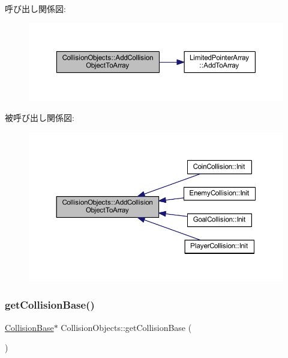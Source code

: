 呼び出し関係図\+:\nopagebreak
\begin{figure}[H]
\begin{center}
\leavevmode
\includegraphics[width=350pt]{class_collision_objects_a50d6593f98cd04e23ad7ea9102eccc3c_cgraph}
\end{center}
\end{figure}
被呼び出し関係図\+:\nopagebreak
\begin{figure}[H]
\begin{center}
\leavevmode
\includegraphics[width=350pt]{class_collision_objects_a50d6593f98cd04e23ad7ea9102eccc3c_icgraph}
\end{center}
\end{figure}
\mbox{\label{class_collision_objects_af95769194fff92babcf411c2262c9d10}} 
\subsubsection{\texorpdfstring{get\+Collision\+Base()}{getCollisionBase()}}
{\footnotesize\ttfamily \mbox{\hyperlink{class_collision_base}{Collision\+Base}}$\ast$ Collision\+Objects\+::get\+Collision\+Base (\begin{DoxyParamCaption}{ }\end{DoxyParamCaption})\hspace{0.3cm}{\ttfamily [inline]}}




